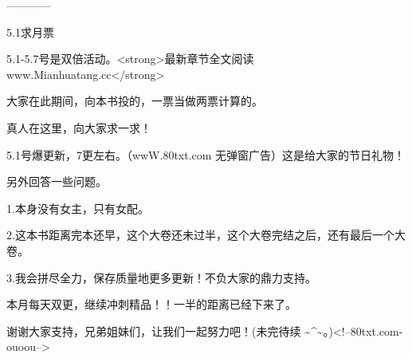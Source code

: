 \begin{this_body}
------------

5.1求月票

5.1-5.7号是双倍活动。<strong>最新章节全文阅读www.Mianhuatang.cc</strong>

大家在此期间，向本书投的，一票当做两票计算的。

真人在这里，向大家求一求！

5.1号爆更新，7更左右。（wwW.80txt.com 无弹窗广告）这是给大家的节日礼物！

另外回答一些问题。

1.本身没有女主，只有女配。

2.这本书距离完本还早，这个大卷还未过半，这个大卷完结之后，还有最后一个大卷。

3.我会拼尽全力，保存质量地更多更新！不负大家的鼎力支持。

本月每天双更，继续冲刺精品！！一半的距离已经下来了。

谢谢大家支持，兄弟姐妹们，让我们一起努力吧！(未完待续 \~{}\^{}\~{}。)<!--80txt.com-ouoou-->

\end{this_body}

